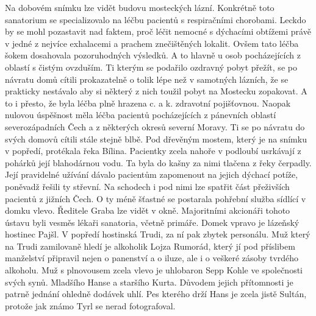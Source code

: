 
Na dobovém snímku lze vidět budovu mosteckých lázní. Konkrétně toto
sanatorium se specializovalo na léčbu pacientů s respiračními
chorobami. Leckdo by se mohl pozastavit nad faktem, proč léčit nemocné
s dýchacími obtížemi právě v jedné z nejvíce exhalacemi a prachem
znečištěných lokalit. Ovšem tato léčba šokem dosahovala pozoruhodných
výsledků. A to hlavně u osob pocházejících z oblastí s čistým
ovzduším. Ti kterým se podařilo ozdravný pobyt přežít, se po návratu
domů cítili prokazatelně o tolik lépe než v samotných lázních, že se
prakticky nestávalo aby si některý z nich toužil pobyt na Mostecku
zopakovat. A to i přesto, že byla léčba plně hrazena c. a k. zdravotní
pojišťovnou. Naopak nulovou úspěšnost měla léčba pacientů
pocházejících z pánevních oblastí severozápadních Čech a z některých
okresů severní Moravy. Ti se po návratu do svých domovů cítili stále
stejně blbě. Pod dřevěným mostem, který je na snímku v popředí,
protékala řeka Bílina. Pacientky zcela nahoře v podloubí usrkávají z
pohárků její blahodárnou vodu. Ta byla do kašny za nimi tlačena z řeky
čerpadly. Její pravidelné užívání dávalo pacientům zapomenout na
jejich dýchací potíže, poněvadž řešili ty střevní. Na schodech i pod
nimi lze spatřit část přeživších pacientů z jižních Čech. O ty méně
šťastné se postarala pohřební služba sídlící v domku vlevo. Ředitele
Graba lze vidět v okně. Majoritními akcionáři tohoto ústavu byli
vesměs lékaři sanatoria, včetně primáře. Domek vpravo je lázeňský
hostinec Pajšl. V popředí hostinská Trudi, za ní pak zbytek personálu.
Muž který na Trudi zamilovaně hledí je alkoholik Lojza Rumorád, který
jí pod příslibem manželství připravil nejen o panenství a o iluze, ale
i o veškeré zásoby tvrdého alkoholu. Muž s plnovousem zcela vlevo je
uhlobaron Sepp Kohle ve společnosti svých synů. Mladšího Hanse a
staršího Kurta. Důvodem jejich přítomnosti je patrně jednání ohledně
dodávek uhlí. Pes kterého drží Hans je zcela jistě Sultán, protože jak
známo Tyrl se nerad fotografoval.

